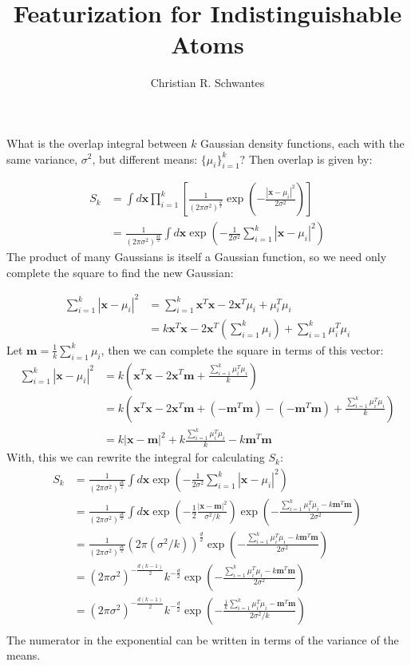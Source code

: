 \documentclass[journal=jctcce, manuscript=article]{achemso}
\title{Featurization for Indistinguishable Atoms}
\author{Christian R. Schwantes}
\affiliation{Department of Chemistry, Stanford University, Stanford, CA 94305}
\begin{document}
What is the overlap integral between $k$ Gaussian density functions, each with the same variance, $\sigma^2$, but different means: $\{\mu_i\}_{i=1}^k$? Then overlap is given by:

\begin{align}
S_k &= \int d\mathbf{x}\prod_{i=1}^k \left[\frac{1}{(2\pi \sigma^2)^\frac{d}{2}} \exp\left(- \frac{|\mathbf{x} - \mu_i|^2}{2 \sigma^2} \right) \right] \\
	&= \frac{1}{(2 \pi \sigma^2)^\frac{dk}{2}} \int d\mathbf{x} \exp\left(- \frac{1}{2\sigma^2} \sum_{i=1}^k |\mathbf{x} - \mu_i|^2\right)
\end{align} The product of many Gaussians is itself a Gaussian function, so we need only complete the square to find the new Gaussian:

\begin{align*}
\sum_{i=1}^k |\mathbf{x} - \mu_i|^2 &= \sum_{i=1}^k \mathbf{x}^T \mathbf{x} - 2 \mathbf{x}^T \mu_i + \mu_i^T \mu_i \\
	&= k \mathbf{x}^T \mathbf{x} - 2 \mathbf{x}^T \left(\sum_{i=1}^k \mu_i\right) + \sum_{i=1}^k \mu_i^T \mu_i 
\end{align*} Let $\mathbf{m} = \frac{1}{k}\sum_{i=1}^k \mu_i$, then we can complete the square in terms of this vector:
\begin{align*}
\sum_{i=1}^k |\mathbf{x} - \mu_i|^2 &= k\left( \mathbf{x}^T \mathbf{x} - 2 \mathbf{x}^T \mathbf{m} + \frac{\sum_{i=1}^k \mu_i^T \mu_i}{k} \right) \\
	&= k\left( \mathbf{x}^T \mathbf{x} - 2 \mathbf{x}^T \mathbf{m} + (- \mathbf{m}^T \mathbf{m}) - (-\mathbf{m}^T\mathbf{m}) + \frac{\sum_{i=1}^k \mu_i^T \mu_i}{k} \right) \\
	&= k|\mathbf{x} - \mathbf{m}|^2 + k \frac{\sum_{i=1}^k \mu_i^T \mu_i}{k} - k \mathbf{m}^T \mathbf{m}
\end{align*} With, this we can rewrite the integral for calculating $S_k$:
\begin{align}
S_k &= \frac{1}{(2 \pi \sigma^2)^\frac{dk}{2}} \int d\mathbf{x} \exp\left(- \frac{1}{2\sigma^2} \sum_{i=1}^k |\mathbf{x} - \mu_i|^2\right) \\
	&= \frac{1}{(2 \pi \sigma^2)^\frac{dk}{2}} \int d\mathbf{x} \exp\left(- \frac{1}{2} \frac{|\mathbf{x} - \mathbf{m}|^2}{ \sigma^2 / k}\right) \exp\left(- \frac{\sum_{i=1}^k \mu_i^T\mu_i - k \mathbf{m}^T \mathbf{m}}{2 \sigma^2}\right) \\
	&= \frac{1}{(2 \pi \sigma^2)^\frac{dk}{2}} (2 \pi(\sigma^2 / k))^\frac{d}{2} \exp\left(- \frac{\sum_{i=1}^k \mu_i^T\mu_i - k \mathbf{m}^T \mathbf{m}}{2 \sigma^2}\right) \\
	&= (2\pi \sigma^2)^{- \frac{d (k - 1)}{2}} k^{-\frac{d}{2}} \exp\left(- \frac{\sum_{i=1}^k \mu_i^T\mu_i - k \mathbf{m}^T \mathbf{m}}{2 \sigma^2}\right) \\
		&= (2\pi \sigma^2)^{- \frac{d (k - 1)}{2}} k^{-\frac{d}{2}} \exp\left(- \frac{\frac{1}{k}\sum_{i=1}^k \mu_i^T\mu_i - \mathbf{m}^T \mathbf{m}}{2 \sigma^2 / k}\right) \\
\end{align} The numerator in the exponential can be written in terms of the variance of the means.
\end{document}
